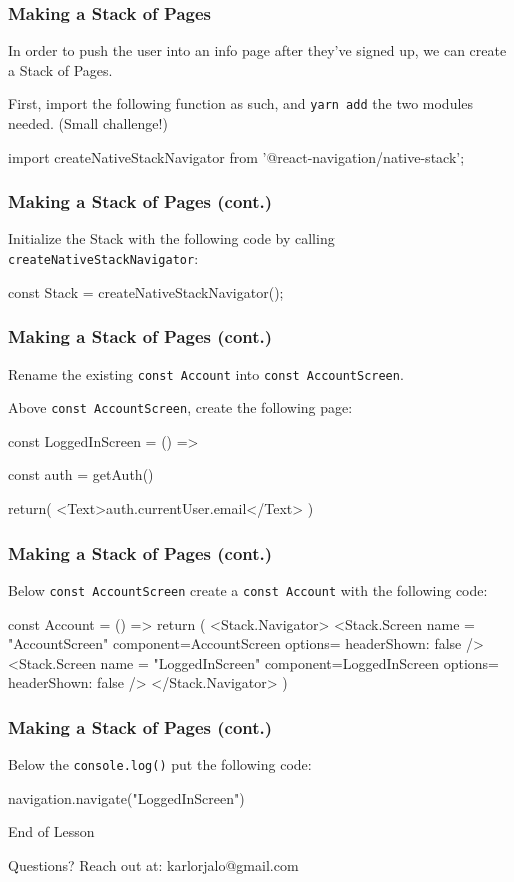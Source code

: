 \documentclass{beamer}
\begin{document}
    \begin{frame}[fragile]
      \frametitle{Making a Stack of Pages}
      In order to push the user into an info page after they've signed up, we can create a Stack of Pages. 

      First, import the following function as such, and \verb|yarn add| the two modules needed. (Small challenge!)

      \begin{jscodesmall}
import {createNativeStackNavigator} from '@react-navigation/native-stack';
      \end{jscodesmall}
    \end{frame}
    \begin{frame}[fragile]
      \frametitle{Making a Stack of Pages (cont.)}
      Initialize the Stack with the following code by calling \verb|createNativeStackNavigator|:

      \begin{jscode}
const Stack = createNativeStackNavigator();
      \end{jscode}
    \end{frame}
    \begin{frame}[fragile]
      \frametitle{Making a Stack of Pages (cont.)}
      Rename the existing \verb|const Account| into \verb|const AccountScreen|. 

      Above \verb|const AccountScreen|, create the following page: 

      \begin{jscodesmall}
const LoggedInScreen = () => {
  const auth = getAuth()

  return( 
    <Text>{auth.currentUser.email}</Text>
  )
}
      \end{jscodesmall}
    \end{frame}
    \begin{frame}[fragile]
      \frametitle{Making a Stack of Pages (cont.)}
      Below \verb|const AccountScreen| create a \verb|const Account| with the following code: 

      \begin{jscodesmall}
const Account = () => {
  return (
    <Stack.Navigator>
      <Stack.Screen
      name = "AccountScreen"
      component={AccountScreen}
      options={{ headerShown: false }}
      />
      <Stack.Screen
      name = "LoggedInScreen"
      component={LoggedInScreen}
      options={{ headerShown: false }}
      />
    </Stack.Navigator>
  )
}    
      \end{jscodesmall}
    \end{frame}
    \begin{frame}[fragile]
      \frametitle{Making a Stack of Pages (cont.)}
      Below the \verb|console.log()| put the following code:

      \begin{jscodesmall}
navigation.navigate("LoggedInScreen")
      \end{jscodesmall}
    \end{frame}

  \appendix

  \begin{frame}[standout]
    End of Lesson

    {\small Questions? Reach out at:}
    {\footnotesize karlorjalo@gmail.com}
  \end{frame}
\end{document}
